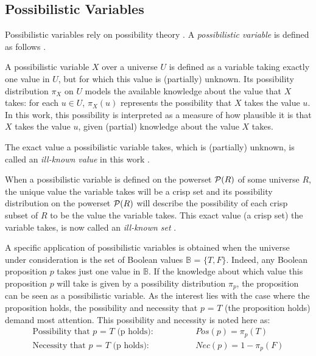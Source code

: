 \subsection{\label{subsec:possibilistic-variables}Possibilistic Variables}
Possibilistic variables rely on possibility theory \cite{Dubois1988a}. A \emph{possibilistic variable} is defined as follows \cite{Pons2011}.

\begin{definition}
A possibilistic variable $X$ over a universe $U$ is defined as a variable taking exactly one value in $U$, but for which this value is (partially) unknown. Its possibility distribution $\pi_X$ on $U$ models the available knowledge about the value that $X$ takes: for each $u\in U$, $\pi_X(u)$ represents the possibility that $X$ takes the value $u$. In this work, this possibility is interpreted as a measure of how plausible it is that $X$ takes the value $u$, given (partial) knowledge about the value $X$ takes.
\end{definition}

The exact value a possibilistic variable takes, which is (partially) unknown, is called an \emph{ill-known value} in this work \cite{Dubois1988a}.

When a possibilistic variable is defined on the powerset $\mathcal{P}(R)$ of some universe $R$, the unique value the variable takes will be a crisp set and its possibility distribution on the powerset $\mathcal{P}(R)$ will describe the possibility of each crisp subset of $R$ to be the value the variable takes. This exact value (a crisp set) the variable takes, is now called an \emph{ill-known set} \cite{Dubois1988a}.


A specific application of possibilistic variables is obtained when the universe under consideration is the set of Boolean values $\mathbb{B}$ = $\{T,F\}$. Indeed, any Boolean proposition $p$ takes just one value in $\mathbb{B}$. If the knowledge about which value this proposition $p$ will take is given by a possibility distribution $\pi_p$, the proposition can be seen as a possibilistic variable. As the interest lies with the case where the proposition holds, the possibility and necessity that $p$ = $T$ (the proposition holds) demand most attention. This possibility and necessity is noted here as:
\begin{align}
\text{Possibility that $p$ = $T$ (p holds):} \hspace{50pt} & Pos(p) = \pi_p(T) \label{propholdsposs} \\
\text{Necessity that $p$ = $T$ (p holds):} \hspace{50pt} & Nec(p) = 1-\pi_p(F) \label{propholdsnecc}
\end{align}


